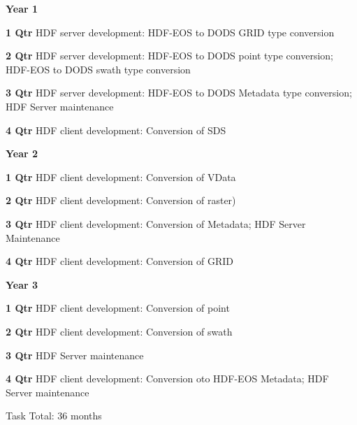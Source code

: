 \documentclass[12pt]{article}
\begin{document}
\begin{description}
 \item{\large \bf  Year 1}
   \begin{description}

   \item{\bf 1 Qtr} HDF server development: HDF-EOS to DODS GRID type
     conversion 

   \item{\bf 2 Qtr} HDF server development: HDF-EOS to DODS point type
     conversion; HDF-EOS to DODS swath type conversion

   \item{\bf 3 Qtr} HDF server development: HDF-EOS to DODS Metadata type
     conversion; HDF Server maintenance

   \item{\bf 4 Qtr} HDF client development: Conversion of SDS

   \end{description}
 \item{\large \bf  Year 2}
   \begin{description}

   \item{\bf 1 Qtr} HDF client development: Conversion of VData

   \item{\bf 2 Qtr} HDF client development: Conversion of raster)

  \item{\bf 3 Qtr}  HDF client development: Conversion of Metadata; HDF Server 
         Maintenance

       \item{\bf 4 Qtr} HDF client development: Conversion of GRID

   \end{description}
 \item{\large \bf  Year 3}
   \begin{description}

   \item{\bf 1 Qtr} HDF client development: Conversion of point

   \item{\bf 2 Qtr} HDF client development: Conversion of swath

   \item{\bf 3 Qtr} HDF Server maintenance

   \item{\bf 4 Qtr} HDF client development: Conversion oto HDF-EOS Metadata;
     HDF Server maintenance

 Task Total: 36 months



\end{description}
\end{description}
\end{document}

